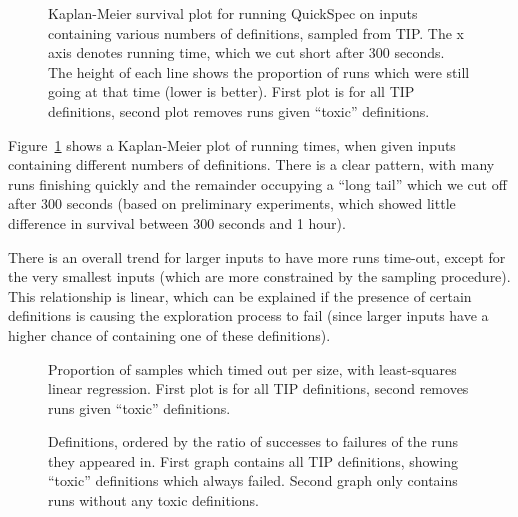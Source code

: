 \begin{figure}
  \scalebox{0.45}{}
  \scalebox{0.45}{}
  \caption{Kaplan-Meier survival plot for running QuickSpec on inputs
    containing various numbers of definitions, sampled from TIP. The x axis
    denotes running time, which we cut short after 300 seconds. The height of
    each line shows the proportion of \qspec{} runs which were still going at
    that time (lower is better). First plot is for all TIP definitions, second
    plot removes runs given ``toxic'' definitions.}
  \label{fig:survival}
\end{figure}

Figure~\ref{fig:survival} shows a Kaplan-Meier plot of \qspec{} running
times, when given inputs containing different numbers of definitions. There is a
clear pattern, with many runs finishing quickly and the remainder occupying a
``long tail'' which we cut off after 300 seconds (based on preliminary
experiments, which showed little difference in survival between 300 seconds and
1 hour).

There is an overall trend for larger inputs to have more runs time-out, except
for the very smallest inputs (which are more constrained by the sampling
procedure). This relationship is linear, which can be explained if the presence
of certain definitions is causing the exploration process to fail (since larger
inputs have a higher chance of containing one of these definitions).

\begin{figure}
  \scalebox{0.45}{}
  \scalebox{0.45}{}
  \caption{Proportion of samples which timed out per size, with least-squares
    linear regression. First plot is for all TIP definitions, second removes
    runs given ``toxic'' definitions.}
  \label{fig:tailsize}
\end{figure}

\begin{figure}
  \scalebox{0.45}{}
  \scalebox{0.45}{}
  \label{fig:proportions}
  \caption{Definitions, ordered by the ratio of successes to failures of the
    runs they appeared in. First graph contains all TIP definitions, showing
    ``toxic'' definitions which always failed. Second graph only contains runs
    without any toxic definitions.}
\end{figure}

